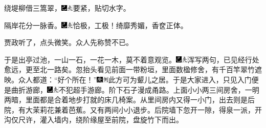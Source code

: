 绕堤柳借三篙翠，{\includegraphics[width=3mm]{../Images/00003}\includegraphics[width=3mm]{../Images/00012}\footnotesize \kaishu 要紧，贴切水字。}

隔岸花分一脉香。{\includegraphics[width=3mm]{../Images/00003}\includegraphics[width=3mm]{../Images/00012}\footnotesize \kaishu 恰极，工极！绮靡秀媚，香奁正体。}

贾政听了，点头微笑。众人先称赞不已。

于是出亭过池，一山一石，一花一木，莫不着意观览。{\includegraphics[width=3mm]{../Images/00003}\includegraphics[width=3mm]{../Images/00012}\footnotesize \kaishu 浑写两句，已见经行处愈远，更至北一路矣。}忽抬头看见前面一带粉垣，里面数楹修舍，有千百竿翠竹遮映。众人都道：``好个所在！''{\includegraphics[width=3mm]{../Images/00004}\includegraphics[width=3mm]{../Images/00011}\footnotesize \kaishu 此方可为颦儿之居。}于是大家进入，只见入门便是曲折游廊，{\includegraphics[width=3mm]{../Images/00003}\includegraphics[width=3mm]{../Images/00012}\footnotesize \kaishu 不犯超手游廊。}阶下石子漫成甬路。上面小小两三间房舍，一明两暗，里面都是合着地步打就的床几椅案。从里间房内又得一小门，出去则是后院，有大茉莉花兼着芭蕉。又有两间小小退步。后院墙下忽开一隙，得泉一派，开沟仅尺许，灌入墙内，绕阶缘屋至前院，盘旋竹下而出。

